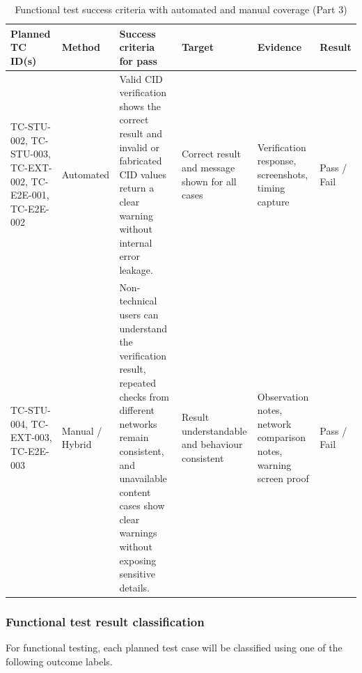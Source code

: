 \begin{table}[H]
  \centering
  \smalltable
  \footnotesize
  {%
  \setlength{\tabcolsep}{4pt}%
  \renewcommand{\arraystretch}{1.35}%

  \begin{tabular}{|>{\raggedright\arraybackslash}p{}|
                  >{\raggedright\arraybackslash}p{}|
                  >{\raggedright\arraybackslash}p{}|
                  >{\raggedright\arraybackslash}p{}|
                  >{\raggedright\arraybackslash}p{}|
                  >{\raggedright\arraybackslash}p{}|}
    \hline
    \textbf{Planned TC ID(s)} &
    \textbf{Method} &
    \textbf{Success criteria for pass} &
    \textbf{Target} &
    \textbf{Evidence} &
    \textbf{Result} \\
    \hline\hline

    TC-STU-002, TC-STU-003, TC-EXT-002, TC-E2E-001, TC-E2E-002 &
    Automated &
    Valid CID verification shows the correct result and invalid or fabricated
    CID values return a clear warning without internal error leakage. &
    Correct result and message shown for all cases &
    Verification response, screenshots, timing capture &
    Pass / Fail \\
    \hline

    TC-STU-004, TC-EXT-003, TC-E2E-003 &
    Manual / Hybrid &
    Non-technical users can understand the verification result, repeated checks
    from different networks remain consistent, and unavailable content cases
    show clear warnings without exposing sensitive details. &
    Result understandable and behaviour consistent &
    Observation notes, network comparison notes, warning screen proof &
    Pass / Fail \\
    \hline

  \end{tabular}
  }%
  \captionsetup{type=table}
  \caption{Functional test success criteria with automated and manual coverage (Part 3)}
  \label{tab:functional-success-criteria-c}
\end{table}

\subsubsection{Functional test result classification}

For functional testing, each planned test case will be classified using one of
the following outcome labels.

